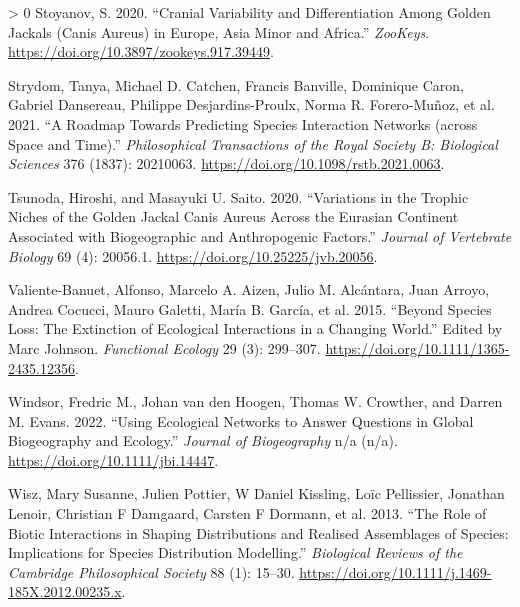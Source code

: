 \documentclass[10pt,oneside]{article}
\newlength{\cslhangindent}
\newenvironment{CSLReferences}[3] %
 {%
  \setlength{\parindent}{0pt}
  \ifodd #1 \everypar{\setlength{\hangindent}{\cslhangindent}}\ignorespaces\fi
  \ifnum #2 > 0
  \setlength{\parskip}{#2\baselineskip}
  \fi
 }%
 {}
\begin{document}
\begin{CSLReferences}{1}{0}
\leavevmode\hypertarget{ref-Stoyanov2020CraVar}{}%
Stoyanov, S. 2020. {``Cranial Variability and Differentiation Among
Golden Jackals (Canis Aureus) in Europe, Asia Minor and Africa.''}
\emph{ZooKeys}. \url{https://doi.org/10.3897/zookeys.917.39449}.

\leavevmode\hypertarget{ref-Strydom2021RoaPre}{}%
Strydom, Tanya, Michael D. Catchen, Francis Banville, Dominique Caron,
Gabriel Dansereau, Philippe Desjardins-Proulx, Norma R. Forero-Muñoz, et
al. 2021. {``A Roadmap Towards Predicting Species Interaction Networks
(across Space and Time).''} \emph{Philosophical Transactions of the
Royal Society B: Biological Sciences} 376 (1837): 20210063.
\url{https://doi.org/10.1098/rstb.2021.0063}.

\leavevmode\hypertarget{ref-Tsunoda2020VarTro}{}%
Tsunoda, Hiroshi, and Masayuki U. Saito. 2020. {``Variations in the
Trophic Niches of the Golden Jackal Canis Aureus Across the Eurasian
Continent Associated with Biogeographic and Anthropogenic Factors.''}
\emph{Journal of Vertebrate Biology} 69 (4): 20056.1.
\url{https://doi.org/10.25225/jvb.20056}.

\leavevmode\hypertarget{ref-Valiente-Banuet2015SpeLos}{}%
Valiente-Banuet, Alfonso, Marcelo A. Aizen, Julio M. Alcántara, Juan
Arroyo, Andrea Cocucci, Mauro Galetti, María B. García, et al. 2015.
{``Beyond Species Loss: The Extinction of Ecological Interactions in a
Changing World.''} Edited by Marc Johnson. \emph{Functional Ecology} 29
(3): 299--307. \url{https://doi.org/10.1111/1365-2435.12356}.

\leavevmode\hypertarget{ref-Windsor2022UsiEco}{}%
Windsor, Fredric M., Johan van den Hoogen, Thomas W. Crowther, and
Darren M. Evans. 2022. {``Using Ecological Networks to Answer Questions
in Global Biogeography and Ecology.''} \emph{Journal of Biogeography}
n/a (n/a). \url{https://doi.org/10.1111/jbi.14447}.

\leavevmode\hypertarget{ref-Wisz2013RolBio}{}%
Wisz, Mary Susanne, Julien Pottier, W Daniel Kissling, Loïc Pellissier,
Jonathan Lenoir, Christian F Damgaard, Carsten F Dormann, et al. 2013.
{``The Role of Biotic Interactions in Shaping Distributions and Realised
Assemblages of Species: Implications for Species Distribution
Modelling.''} \emph{Biological Reviews of the Cambridge Philosophical
Society} 88 (1): 15--30.
\url{https://doi.org/10.1111/j.1469-185X.2012.00235.x}.

\end{CSLReferences}
\end{document}
